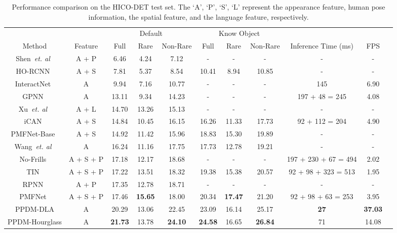 \documentclass[10pt,twocolumn,letterpaper]{article}
\begin{document}
\begin{table*}[htb!]
\begin{center}
  \begin{tabular}{cc|ccc|ccc|ccc}
    \hline
    &&\multicolumn{3}{c|}{Default} & \multicolumn{3}{c|}{Know Object} &&\\
  Method              &Feature    & Full & Rare & Non-Rare & Full  & Rare & Non-Rare & Inference Time (ms)   & FPS \\
  \hline
Shen~\emph{et. al}~\cite{shen2018scaling} & A + P &6.46 &4.24 &7.12 & -  & -& -  & -& -\\
  HO-RCNN~\cite{chao2018learning}       &  A + S           & 7.81         & 5.37         & 8.54 & 10.41& 8.94& 10.85 & - &-         \\
  InteractNet~\cite{gkioxari2018detecting}  & A         & 9.94         & 7.16         & 10.77   &- & -&-  & 145 &6.90     \\
  GPNN~\cite{qi2018learning}     & A              & 13.11        & 9.34         & 14.23&- & -&-& 197 +  48 = 245 & 4.08\\
  Xu~\emph{et. al}~\cite{Xu_2019_CVPR} & A + L &14.70 & 13.26& 15.13&- & -&-& - & -\\
  iCAN~\cite{gao2018ican}      & A + S             & 14.84        & 10.45        & 16.15  &16.26 &11.33& 17.73 &92 +  112 = 204 &4.90    \\
  PMFNet-Base~\cite{Wan_2019_ICCV} &A + S &  14.92 &11.42 & 15.96 & 18.83& 15.30& 19.89&- & - \\ 
  Wang~\emph{et. al}~\cite{Wang_2019_ICCV} & A & 16.24 &11.16 &17.75 &17.73 &12.78 &19.21& - & - \\
  No-Frills~\cite{gupta2018no} &A + S + P  & 17.18 & 12.17 & 18.68&- & -&-& 197 + 230 + 67 = 494 & 2.02\\
  TIN~\cite{li2018transferable}      & A + S + P         & 17.22        & 13.51        & 18.32&19.38&	15.38&	20.57&92 + 98 + 323 = 513 &1.95         \\
  RPNN~\cite{Zhou_2019_ICCV} &A + P & 17.35 &12.78 &18.71&-&-&-& - & - \\
  PMFNet~\cite{Wan_2019_ICCV} &A + S + P & 17.46 & \textbf{15.65} & 18.00 &20.34& \textbf{17.47}& 21.20&92 + 98 + 63 = 253 & 3.95 \\ \hline
  PPDM-DLA & A &20.29&	13.06&	22.45&	23.09&	16.14&	25.17& \textbf{27} & \textbf{37.03} \\ 
  PPDM-Hourglass & A & \textbf{21.73}&	13.78&	\textbf{24.10}&	\textbf{24.58}&	16.65&	\textbf{26.84}& 71 & 14.08 \\
  
 \hline          
  \end{tabular}
  \end{center}
  \vspace{-2mm}
    \caption{Performance comparison on the HICO-DET test set. The `A', `P', `S', `L' represent the appearance feature, human pose information,  the spatial feature, and the language feature, respectively.}
  \label{tb:hico}
  \vspace{-4mm}
  \end{table*}
\end{document}
